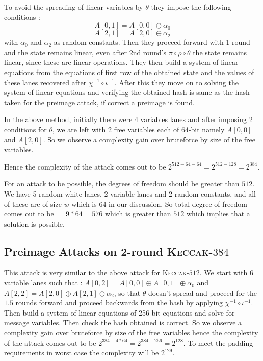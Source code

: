 \documentclass[runningheads]{llncs}
\newcommand{\KECCAK}{\mbox{\textsc{Keccak}}}
\begin{document}
		To avoid the spreading of linear variables by $\theta$ they impose the following conditions : 
		\[
			A[0, 1] = A[0, 0] \oplus \alpha_{0}
		\]
		\[
			A[2, 1] = A[2, 0] \oplus \alpha_{2}
		\]
		with $\alpha_0$ and $\alpha_2$ as random constants.
		Then they proceed forward with 1-round and the state remains linear, even after 2nd round's $\pi \circ \rho \circ \theta$ the state remains linear, since these are linear operations. They then build a system of linear equations from the equations of first row of the obtained state and the values of these lanes recovered after $\chi^{-1} \circ \iota^{-1}$. After this they move on to solving the system of linear equations and verifying the obtained hash is same as the hash taken for the preimage attack, if correct a preimage is found.
		
		In the above method, initially there were 4 variables lanes and after imposing 2 conditions for $\theta$, we are left with 2 free variables each of 64-bit namely $A[0,0]$ and $A[2, 0]$. So we observe a complexity gain over bruteforce by size of the free variables.
		
		Hence the complexity of the attack comes out to be $2^{512 - 64 - 64} = 2^{512 - 128} = 2^{384}$.

		For an attack to be possible, the degrees of freedom should be greater than $512$. We have 5 random white lanes, 2 variable lanes and 2 random constants, and all of these are of size $w$ which is $64$ in our discussion. So total degree of freedom comes out to be $= 9 * 64 = 576$ which is greater than $512$ which implies that a solution is possible.

\subsection{Preimage Attacks on 2-round \KECCAK-$384$}
	This attack is very similar to the above attack for \KECCAK-$512$. We start with 6 variable lanes such that :
	$A[0, 2] = A[0, 0] \oplus A[0, 1] \oplus \alpha_0$ and $A[2, 2] = A[2, 0] \oplus A[2, 1] \oplus \alpha_2$, so that $\theta$ doesn't spread and proceed for the $1.5$ rounds forward and proceed backwards from the hash by applying $\chi^{-1} \circ \iota^{-1}$. Then build a system of linear equations of 256-bit equations and solve for message variables. Then check the hash obtained is correct. So we observe a complexity gain over bruteforce by size of the free variables hence the complexity of the attack comes out to be $2^{384 - 4*64} = 2^{384 - 256} = 2^{128}$. To meet the padding requirements in worst case the complexity will be $2^{129}$.
\end{document}
